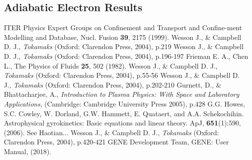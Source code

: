 \documentclass[12pt]{article}
\numberwithin{equation}{subsection}
\begin{document}
\subsection{Adiabatic Electron Results}


\begin{thebibliography}{0}
   
    ITER Physics Expert Groups on Confinement and Transport and Confine-ment Modelling and Database, Nucl. Fusion \textbf{39}, 2175 (1999).
    Wesson J., \& Campbell D. J., \textit{Tokamaks} (Oxford: Clarendon Press, 2004), p.219
    Wesson J., \& Campbell D. J., \textit{Tokamaks} (Oxford: Clarendon Press, 2004), p.196-197
    Frieman E. A., Chen L., The Physics of Fluids \textbf{25}, 502 (1982).
    Wesson J., \& Campbell D. J., \textit{Tokamaks} (Oxford: Clarendon Press, 2004), p.55-56
    Wesson J., \& Campbell D. J., \textit{Tokamaks} (Oxford: Clarendon Press, 2004), p.202-210
    Gurnett, D., \& Bhattacharjee, A., \textit{Introduction to Plasma Physics: With Space and Laboratory Applications},
                       (Cambridge: Cambridge University Press 2005), p.428
    G.G. Howes, S.C. Cowley, W. Dorland, G.W. Hammett, E. Quataert, and A.A. Schekochihin.
                         Astrophysical gyrokinetics: Basic equations and linear theory. ApJ, \textbf{651}(1):590, (2006).
    See Haotian...
    Wesson J., \& Campbell D. J., \textit{Tokamaks} (Oxford: Clarendon Press, 2004), p.420-421
    GENE Development Team, GENE: User Manual, (2018).

\end{thebibliography}
    
\end{document}

